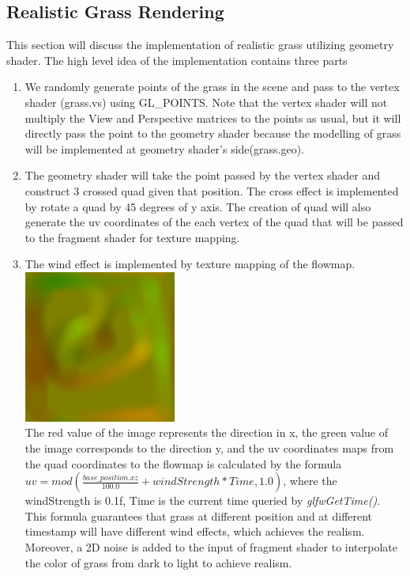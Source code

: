 \documentclass {article}
\begin{document}
\subsection{Realistic Grass Rendering}
This section will discuss the implementation of realistic grass utilizing geometry shader. The high level idea of the implementation contains three parts
\begin{enumerate}
    \item We randomly generate points of the grass in the scene and pass to the vertex shader (grass.vs) using GL\_POINTS. Note that the vertex shader will not multiply the View and Perspective
    matrices to the points as usual, but it will directly pass the point to the geometry shader because the modelling of grass will be implemented at geometry shader's side(grass.geo).
    \item The geometry shader will take the point passed by the vertex shader and construct 3 crossed quad given that position. The cross effect is implemented by rotate a quad by 45 degrees of y axis.
    The creation of quad will also generate the uv coordinates of the each vertex of the quad that will be passed to the fragment shader for texture mapping.
    \item The wind effect is implemented by texture mapping of the flowmap. \\
    \includegraphics[width=50mm]{flowmap.png} \\
    The red value of the image represents the direction in x, the green value of the image corresponds to the direction y, and the uv coordinates maps from the quad coordinates to the flowmap is calculated by the formula $uv = mod(\frac{base\_position.xz}{100.0} + windStrength * Time, 1.0)$, where the windStrength is 0.1f, Time is the 
    current time queried by \textit{glfwGetTime()}. This formula guarantees that grass at different position and at different timestamp will have different wind effects, which achieves the realism. \\
    Moreover, a 2D noise is added to the input of fragment shader to interpolate the color of grass from dark to light to achieve realism.

\end{enumerate}
\end{document}
